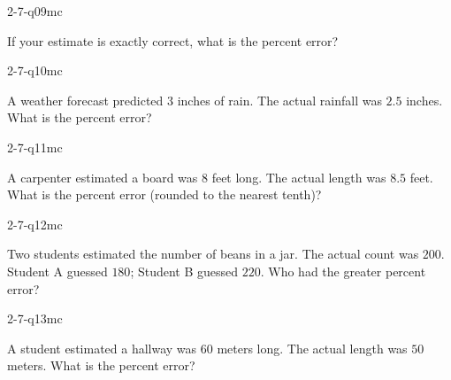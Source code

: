 \begin{practiceQuestion}{2-7-q09}{mc}
\begin{questionText}
If your estimate is exactly correct, what is the percent error?
\end{questionText}
\end{practiceQuestion}

\begin{practiceQuestion}{2-7-q10}{mc}
\begin{questionText}
A weather forecast predicted $3$ inches of rain. The actual rainfall was $2.5$ inches. What is the percent error?
\end{questionText}
\end{practiceQuestion}

\begin{practiceQuestion}{2-7-q11}{mc}
\begin{questionText}
A carpenter estimated a board was $8$ feet long. The actual length was $8.5$ feet. What is the percent error (rounded to the nearest tenth)?
\end{questionText}
\end{practiceQuestion}

\begin{practiceQuestion}{2-7-q12}{mc}
\begin{questionText}
Two students estimated the number of beans in a jar. The actual count was $200$. Student A guessed $180$; Student B guessed $220$. Who had the greater percent error?
\end{questionText}
\end{practiceQuestion}

\begin{practiceQuestion}{2-7-q13}{mc}
\begin{questionText}
A student estimated a hallway was $60$ meters long. The actual length was $50$ meters. What is the percent error?
\end{questionText}
\end{practiceQuestion}

